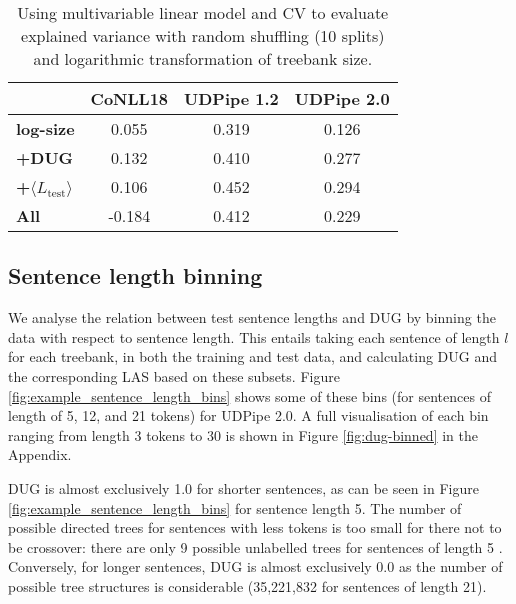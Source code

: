 \documentclass[11pt,a4paper]{article}
\newcommand{\MTL}{{$\langle L_{\textrm{test}}\rangle$}}
\begin{document}
\begin{table}[t!]%
    \centering
    \small
    \begin{tabular}{lccc}
    \toprule
    & \multicolumn{1}{c}{CoNLL18} & \multicolumn{1}{c}{UDPipe 1.2} & UDPipe 2.0 \\
    \midrule
        \textbf{log-size}  & 0.055 & 0.319 & 0.126  \\
        \textbf{+DUG} &  0.132 & 0.410 & 0.277 \\ 
        \textbf{+\MTL} &  0.106 & 0.452 & 0.294\\\midrule
        \textbf{All} & -0.184 & 0.412 & 0.229 \\
        \bottomrule
    \end{tabular}
    \caption{Using multivariable linear model and CV to evaluate explained variance with random shuffling (10 splits) and logarithmic transformation of treebank size.}
    \label{tab:re_results_logged}
\end{table}

\subsection{Sentence length binning}
We analyse the relation between test sentence lengths and DUG by binning the data with respect to sentence length. This entails taking each sentence of length $l$ for each treebank, in both the training and test data, and calculating DUG and the corresponding LAS based on these subsets. Figure \ref{fig:example_sentence_length_bins} shows some of these bins (for sentences of length of 5, 12, and 21 tokens) for UDPipe 2.0. A full visualisation of each bin ranging from length 3 tokens to 30 is shown in Figure \ref{fig:dug-binned} in the Appendix. 

DUG is almost exclusively 1.0 for shorter sentences, as can be seen in Figure \ref{fig:example_sentence_length_bins} for sentence length 5. The number of possible directed trees for sentences with less tokens is too small for there not to be crossover: there are only 9 possible unlabelled trees for sentences of length 5 \cite{oeisA000081}. Conversely, for longer sentences, DUG is almost exclusively 0.0 as the number of possible tree structures is considerable (35,221,832 for sentences of length 21).
\end{document}
